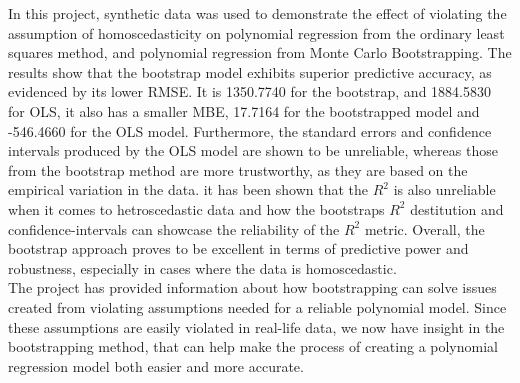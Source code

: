 In this project, synthetic data was used to demonstrate the effect of violating the assumption of homoscedasticity on polynomial regression from the ordinary least squares method, and polynomial regression from Monte Carlo Bootstrapping. The results show that the bootstrap model exhibits superior predictive accuracy, as evidenced by its lower RMSE. It is 1350.7740 for the bootstrap, and 1884.5830 for OLS, it also has a smaller MBE, 17.7164 for the bootstrapped model and -546.4660 for the OLS model. Furthermore, the standard errors and confidence intervals produced by the OLS model are shown to be unreliable, whereas those from the bootstrap method are more trustworthy, as they are based on the empirical variation in the data. it has been shown that the $R^2$ is also unreliable when it comes to hetroscedastic data and how the bootstraps $R^2$ destitution and confidence-intervals can showcase the reliability of the $R^2$ metric. Overall, the bootstrap approach proves to be excellent in terms of predictive power and robustness, especially in cases where the data is homoscedastic.\\

\noindent The project has provided information about how bootstrapping can solve issues created from violating assumptions needed for a reliable polynomial model. Since these assumptions are easily violated in real-life data, we now have insight in the bootstrapping method, that can help make the process of creating a polynomial regression model both easier and more accurate. 